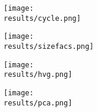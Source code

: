 \documentclass{article}
\begin{document}
\newcommand{\results}{../../real/10X/pics}

\begin{figure}[btp]
    \begin{subfigure}[b]{0.49\textwidth}
        \texttt{[image: \\results/cycle.png]}
        \caption{}
    \end{subfigure}
    \begin{subfigure}[b]{0.49\textwidth}
        \texttt{[image: \\results/sizefacs.png]}
        \caption{}
    \end{subfigure}
    \begin{subfigure}[b]{0.49\textwidth}
        \texttt{[image: \\results/hvg.png]}
        \caption{}
    \end{subfigure}
    \begin{subfigure}[b]{0.49\textwidth}
        \texttt{[image: \\results/pca.png]}
        \caption{}
    \end{subfigure}
\end{figure}
\end{document}
